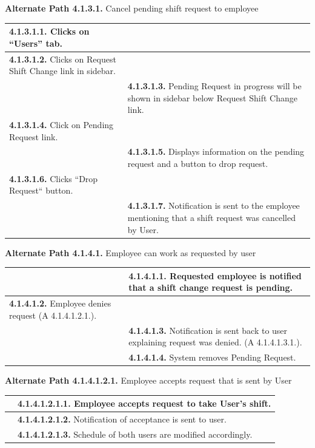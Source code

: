 \documentclass[letterpaper,12pt]{report}
\begin{document}
{\centering \textbf{Alternate Path 4.1.3.1.}
\linebreak Cancel pending shift request to employee
\begin{center}
\xuchead
\begin{tabular}{| p{8.5cm} | p{8.5cm} |}
\hline
\textbf{4.1.3.1.1.} Clicks on ``Users'' tab. & \\
\hline
\textbf{4.1.3.1.2.} Clicks on Request Shift Change link in sidebar. & \\
\hline
& \textbf{4.1.3.1.3.} Pending Request in progress will be shown in sidebar below Request Shift Change link. \\
\hline
\textbf{4.1.3.1.4.} Click on Pending Request link. & \\
\hline
& \textbf{4.1.3.1.5.} Displays information on the pending request and a button to drop request. \\
\hline
\textbf{4.1.3.1.6.} Clicks ``Drop Request`` button. & \\
\hline
& \textbf{4.1.3.1.7.} Notification is sent to the employee mentioning that a shift request was cancelled by User. \\
\hline
\end{tabular}
\end{center}

\pagebreak

\centering \textbf{Alternate Path 4.1.4.1.}
\linebreak Employee can work as requested by user
\begin{center}
\xuchead
\begin{tabular}{| p{8.5cm} | p{8.5cm} |}
\hline
& \textbf{4.1.4.1.1.} Requested employee is notified that a shift change request is pending. \\
\hline
\textbf{4.1.4.1.2.} Employee denies request \newline (A 4.1.4.1.2.1.). & \\
\hline
& \textbf{4.1.4.1.3.} Notification is sent back to user explaining request was denied. (A 4.1.4.1.3.1.). \\
\hline
& \textbf{4.1.4.1.4.} System\index{system} removes Pending Request. \\
\hline
\end{tabular}
\end{center}

\centering \textbf{Alternate Path 4.1.4.1.2.1.}
\linebreak Employee accepts request that is sent by User
\begin{center}
\xuchead
\begin{tabular}{| p{8.5cm} | p{8.5cm} |}
\hline
& \textbf{4.1.4.1.2.1.1.} Employee accepts request to take User’s shift. \\
\hline
& \textbf{4.1.4.1.2.1.2.} Notification of acceptance is sent to user. \\
\hline
& \textbf{4.1.4.1.2.1.3.} Schedule of both users are modified accordingly. \\
\hline
\end{tabular}
\end{center}

}
\end{document}
